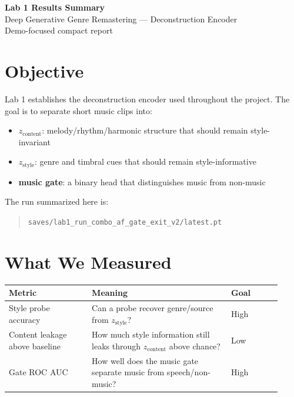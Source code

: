 \documentclass[11pt]{article}
\begin{document}
\begin{center}
{\Large \textbf{Lab 1 Results Summary}}\\[0.35em]
{\normalsize Deep Generative Genre Remastering --- Deconstruction Encoder}\\[0.35em]
{\small Demo-focused compact report}
\end{center}

\section*{Objective}
Lab 1 establishes the deconstruction encoder used throughout the project. The goal is to separate short music clips into:
\begin{itemize}
  \item \textbf{$z_{\text{content}}$}: melody/rhythm/harmonic structure that should remain style-invariant
  \item \textbf{$z_{\text{style}}$}: genre and timbral cues that should remain style-informative
  \item \textbf{music gate}: a binary head that distinguishes music from non-music
\end{itemize}

The run summarized here is:
\begin{quote}
\small
\texttt{saves/lab1\_run\_combo\_af\_gate\_exit\_v2/latest.pt}
\end{quote}

\section*{What We Measured}
\begin{tabular}{>{\raggedright\arraybackslash}p{0.28\linewidth} >{\raggedright\arraybackslash}p{0.47\linewidth} >{\raggedleft\arraybackslash}p{0.17\linewidth}}
\toprule
\textbf{Metric} & \textbf{Meaning} & \textbf{Goal} \\
\midrule
Style probe accuracy & Can a probe recover genre/source from $z_{\text{style}}$? & High \\
Content leakage above baseline & How much style information still leaks through $z_{\text{content}}$ above chance? & Low \\
Gate ROC AUC & How well does the music gate separate music from speech/non-music? & High \\
\bottomrule
\end{tabular}
\end{document}
